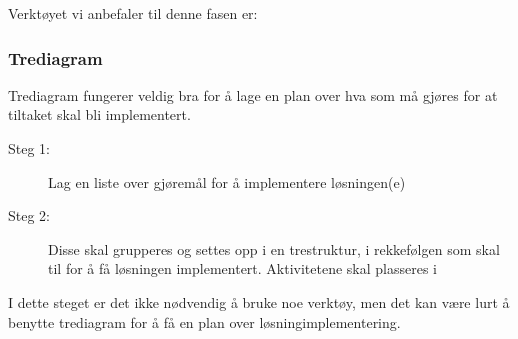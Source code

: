 Verktøyet vi anbefaler til denne fasen er:

\subsubsection{Trediagram}
Trediagram fungerer veldig bra for å lage en plan over hva som må gjøres for at tiltaket skal bli implementert. 
\begin{description}
    \item[Steg 1:] Lag en liste over gjøremål for å implementere løsningen(e)
    \item[Steg 2:] Disse skal grupperes og settes opp i en trestruktur, i rekkefølgen som skal til for å få løsningen implementert. Aktivitetene skal plasseres i 
\end{description}

I dette steget er det ikke nødvendig å bruke noe verktøy, men det kan være lurt å benytte trediagram for å få en plan over løsningimplementering.

